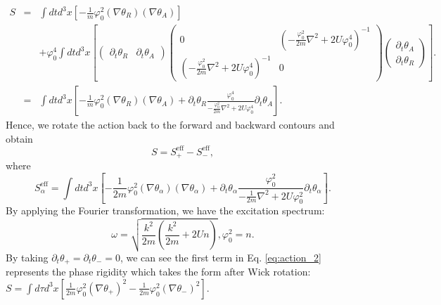 \documentclass[aps,superscriptaddress,notitlepage,longbibliography]{revtex4-1}
\begin{document}
\begin{eqnarray}
S & = & \int dtd^{3}x\left[-\frac{1}{m}\varphi_{0}^{2}(\nabla\theta_{R})(\nabla\theta_{A})\right]\nonumber \\
 &  & +\varphi_{0}^{4}\int dtd^{3}x\left[\left(\begin{array}{cc}
\partial_{t}\theta_{R} & \partial_{t}\theta_{A}\end{array}\right)\left(\begin{array}{cc}
0 & \left(-\frac{\varphi_{0}^{2}}{2m}\nabla^{2}+2U\varphi_{0}^{4}\right)^{-1}\\
\left(-\frac{\varphi_{0}^{2}}{2m}\nabla^{2}+2U\varphi_{0}^{4}\right)^{-1} & 0
\end{array}\right)\left(\begin{array}{c}
\partial_{t}\theta_{A}\\
\partial_{t}\theta_{R}
\end{array}\right)\right].\nonumber \\
 & = & \int dtd^{3}x\left[-\frac{1}{m}\varphi_{0}^{2}(\nabla\theta_{R})(\nabla\theta_{A})+\partial_{t}\theta_{R}\frac{\varphi_{0}^{4}}{-\frac{\varphi_{0}^{2}}{2m}\nabla^{2}+2U\varphi_{0}^{4}}\partial_{t}\theta_{A}\right].
\end{eqnarray}
Hence, we rotate the action back to the forward and backward contours
and obtain 
\begin{equation}
S=S_{+}^{\text{eff}}-S_{-}^{\text{eff}},
\end{equation}
where 
\begin{equation}
S_{\alpha}^{\text{eff}}=\int dtd^{3}x\left[-\frac{1}{2m}\varphi_{0}^{2}(\nabla\theta_{\alpha})(\nabla\theta_{\alpha})+\partial_{t}\theta_{\alpha}\frac{\varphi_{0}^{2}}{-\frac{1}{2m}\nabla^{2}+2U\varphi_{0}^{2}}\partial_{t}\theta_{\alpha}\right].\label{eq:action_2}
\end{equation}
By applying the Fourier transformation, we have the excitation spectrum:
\begin{equation}
\omega=\sqrt{\frac{k^{2}}{2m}\left(\frac{k^{2}}{2m}+2Un\right)},\varphi_{0}^{2}=n.
\end{equation}
By taking $\partial_{t}\theta_{+}=\partial_{t}\theta_{-}=0$, we can
see the first term in Eq. \eqref{eq:action_2} represents the phase
rigidity which takes the form after Wick rotation: $S=\int d\tau d^{3}x\left[\frac{1}{2m}\varphi_{0}^{2}(\nabla\theta_{+})^{2}-\frac{1}{2m}\varphi_{0}^{2}(\nabla\theta_{-})^{2}\right]$.
\end{document}
